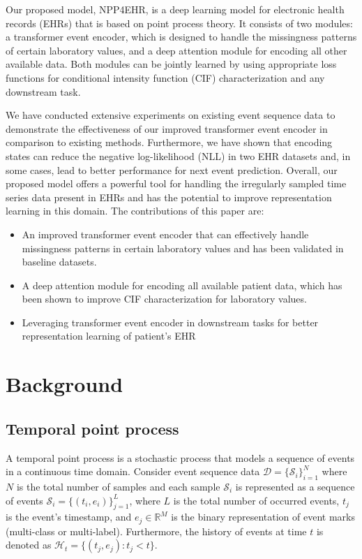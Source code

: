 \documentclass[journal,twoside,web]{ieeecolor}
\begin{document}
Our proposed model, NPP4EHR, is a deep learning model for electronic health records (EHRs) that is based on point process theory. It consists of two modules: a transformer event encoder, which is designed to handle the missingness patterns of certain laboratory values, and a deep attention module for encoding all other available data. Both modules can be jointly learned by using appropriate loss functions for conditional intensity function (CIF) characterization and any downstream task.

We have conducted extensive experiments on existing event sequence data to demonstrate the effectiveness of our improved transformer event encoder in comparison to existing methods. Furthermore, we have shown that encoding states can reduce the negative log-likelihood (NLL) in two EHR datasets and, in some cases, lead to better performance for next event prediction. Overall, our proposed model offers a powerful tool for handling the irregularly sampled time series data present in EHRs and has the potential to improve representation learning in this domain.
The contributions of this paper are:
\begin{itemize}
    \item An improved transformer event encoder that can effectively handle missingness patterns in certain laboratory values and has been validated in baseline datasets.
    \item A deep attention module for encoding all available patient data, which has been shown to improve CIF characterization for laboratory values.
    \item Leveraging transformer event encoder in downstream tasks for better representation learning of patient's EHR
\end{itemize}



\section{Background}
\label{sec:Background}










\subsection{Temporal point process}


A temporal point process is a stochastic process that models a sequence of events in a continuous time domain. Consider event sequence data  $\mathcal{D}=\{\mathcal{S}_{i}\}_{i=1}^N$ where $N$ is the total number of samples and each sample $\mathcal{S}_{i}$ is represented as a sequence of events $\mathcal{S}_{i}=\{(t_i,e_i)\}_{j=1}^L$, where $L$ is the total number of occurred events, $t_j$ is the event's timestamp, and $e_j \in \mathbb{R}^M $ is the binary representation of event marks (multi-class or multi-label). Furthermore, the history of events at time $t$ is denoted as $\mathcal{H}_t=\{(t_j,e_j):t_j<t \}$.
\end{document}
